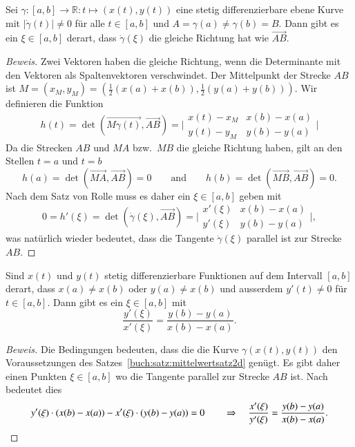 \begin{satz}
\label{buch:satz:mittelwertsatz2d}
Sei $\gamma\colon[a,b]\to\mathbb R:t\mapsto (x(t),y(t))$ eine
stetig differenzierbare ebene Kurve mit $|\dot{\gamma}(t)|\ne 0$ für
alle $t\in[a,b]$ und $A=\gamma(a)\ne\gamma(b)=B$.
Dann gibt es ein $\xi\in[a,b]$ derart, dass $\dot{\gamma}(\xi)$ die gleiche
Richtung hat wie $\overrightarrow{AB}$.
\end{satz}

\begin{proof}[Beweis]
Zwei Vektoren haben die gleiche Richtung, wenn die Determinante
mit den Vektoren als Spaltenvektoren verschwindet.
%
Der Mittelpunkt der Strecke $AB$ ist
$M=(x_M,y_M) = (\frac12(x(a)+x(b)),\frac12(y(a)+y(b)))$.
Wir definieren die Funktion
\[
h(t)
=
\det(\overrightarrow{M\gamma(t)}, \overrightarrow{AB})
=
\biggl|
\begin{matrix}
x(t) - x_M & x(b)-x(a) \\
y(t) - y_M & y(b)-y(a)
\end{matrix}
\biggr|
\]
Da die Strecken $AB$ und $MA$ bzw.~$MB$ die gleiche Richtung haben,
gilt an den Stellen $t=a$ und $t=b$ 
\[
h(a)
=
\det (\overrightarrow{MA},\overrightarrow{AB})
= 0
\qquad\text{and}\qquad
h(b)
=
\det (\overrightarrow{MB},\overrightarrow{AB})
=
0.
\]
Nach dem Satz von Rolle muss es daher ein $\xi\in[a,b]$ geben mit
%
\begin{equation}
0
=
h'(\xi)
=
\det(
\dot{\gamma}(\xi),
\overrightarrow{AB}
)
=
\biggl|
\begin{matrix}
x'(\xi) & x(b)-x(a) \\
y'(\xi) & y(b)-y(a)
\end{matrix}
\biggr|,
\label{buch:polynome:eqn:mittelwertsatz2d}
\end{equation}
was natürlich wieder bedeutet, dass die Tangente $\dot{\gamma}(\xi)$ 
parallel ist zur Strecke $AB$.
\end{proof}


\begin{satz}
\label{buch:satz:vmittelwertsatz}
Sind $x(t)$ und $y(t)$ stetig differenzierbare Funktionen auf dem Intervall
$[a,b]$ derart, dass $x(a)\ne x(b)$ oder $y(a)\ne x(b)$ und ausserdem
$y'(t)\ne 0$ für $t\in[a,b]$.
Dann gibt es ein $\xi\in[a,b]$ mit
\[
\frac{y'(\xi)}{x'(\xi)}
=
\frac{y(b)-y(a)}{x(b)-x(a)}.
\]
\end{satz}

\begin{proof}[Beweis]
Die Bedingungen bedeuten, dass die die Kurve $\gamma(x(t),y(t))$
den Voraussetzungen des Satzes~\ref{buch:satz:mittelwertsatz2d}
genügt.
Es gibt daher einen Punkten $\xi\in[a,b]$ wo die Tangente
parallel zur Strecke $AB$ ist.
Nach~\label{buch:polynome:eqn:mittelwertsatz2d} bedeutet dies
\[
y'(\xi) \cdot (x(b)-x(a))
-
x'(\xi) \cdot (y(b)-y(a))
=0
\qquad\Rightarrow\quad
\frac{x'(\xi)}{y'(\xi)}
=
\frac{y(b)-y(a)}{x(b)-x(a)}.
\qedhere
\]
\end{proof}

